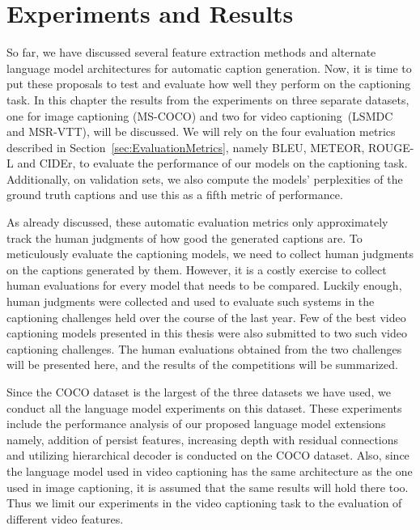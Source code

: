 \chapter{Experiments and Results}
\label{chapter:results}

So far, we have discussed several feature extraction methods and alternate
language model architectures for automatic caption generation.
Now, it is time to put these proposals to test and evaluate how well they
perform on the captioning task.
In this chapter the results from the experiments on three separate datasets, one
for image captioning (MS-COCO) and two for video captioning~(LSMDC and MSR-VTT),
will be discussed.
We will rely on the four evaluation metrics described in
Section~\ref{sec:EvaluationMetrics}, namely BLEU, METEOR, ROUGE-L and CIDEr, to
evaluate the performance of our models on the captioning task.
Additionally, on validation sets, we also compute the models' perplexities of
the ground truth captions and use this as a fifth metric of performance. 

As already discussed, these automatic evaluation metrics only approximately
track the human judgments of how good the generated captions are.
To meticulously evaluate the captioning models, we need to collect human
judgments on the captions generated by them.
However, it is a costly exercise to collect human evaluations for every model
that needs to be compared.
Luckily enough, human judgments were collected and used to evaluate such
systems in the captioning challenges held over the course of the last year.
Few of the best video captioning models presented in this thesis were also
submitted to two such video captioning challenges.
The human evaluations obtained from the two challenges will be presented here,
and the results of the competitions will be summarized. 

Since the COCO dataset is the largest of the three datasets we have used, we
conduct all the language model experiments on this dataset.
These experiments include the performance analysis of our proposed language
model extensions namely, addition of persist features, increasing depth with
residual connections and utilizing hierarchical decoder is conducted on the COCO
dataset.
Also, since the language model used in video captioning has the same
architecture as the one used in image captioning, it is assumed that the same
results will hold there too.
Thus we limit our experiments in the video captioning task to the evaluation of
different video features.

